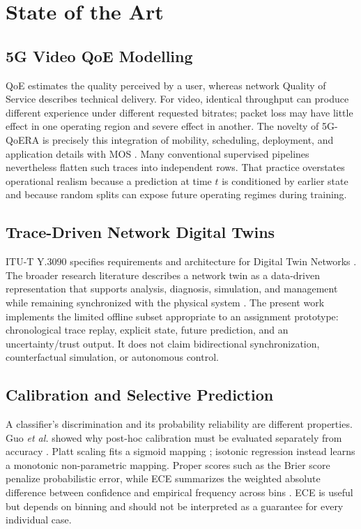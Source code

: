 \documentclass[10pt,conference]{IEEEtran}
\newcommand{\etal}{\textit{et al.}}
\begin{document}
\section{State of the Art}

\subsection{5G Video QoE Modelling}

QoE estimates the quality perceived by a user, whereas network Quality of
Service describes technical delivery.  For video, identical throughput can
produce different experience under different requested bitrates; packet loss
may have little effect in one operating region and severe effect in another.
The novelty of 5G-QoERA is precisely this integration of mobility, scheduling,
deployment, and application details with MOS \cite{boffetti2025qoeira}.
Many conventional supervised pipelines nevertheless flatten such traces into
independent rows.  That practice overstates operational realism because a
prediction at time $t$ is conditioned by earlier state and because random
splits can expose future operating regimes during training.

\subsection{Trace-Driven Network Digital Twins}

ITU-T Y.3090 specifies requirements and architecture for Digital Twin
Networks \cite{itut2022y3090}.  The broader research literature describes a
network twin as a data-driven representation that supports analysis,
diagnosis, simulation, and management while remaining synchronized with the
physical system \cite{almasan2022dtn}.  The present work implements the
limited offline subset appropriate to an assignment prototype: chronological
trace replay, explicit state, future prediction, and an uncertainty/trust
output.  It does not claim bidirectional synchronization, counterfactual
simulation, or autonomous control.

\subsection{Calibration and Selective Prediction}

A classifier's discrimination and its probability reliability are different
properties.  Guo \etal{} showed why post-hoc calibration must be evaluated
separately from accuracy \cite{guo2017calibration}.  Platt scaling fits a
sigmoid mapping \cite{platt1999probabilistic}; isotonic regression instead
learns a monotonic non-parametric mapping.  Proper scores such as the Brier
score \cite{brier1950verification} penalize probabilistic error, while ECE
summarizes the weighted absolute difference between confidence and empirical
frequency across bins \cite{naeini2015calibration}.  ECE is useful but depends
on binning and should not be interpreted as a guarantee for every individual
case.
\end{document}
